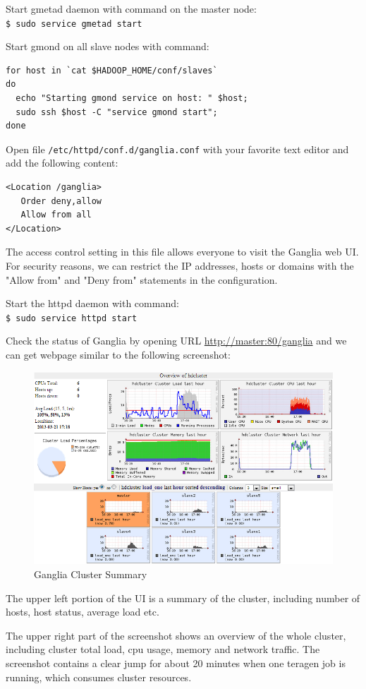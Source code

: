 Start gmetad daemon with command on the master node: \\
\verb|$ sudo service gmetad start|

Start gmond on all slave nodes with command: 
\begin{verbatim}
for host in `cat $HADOOP_HOME/conf/slaves`
do
  echo "Starting gmond service on host: " $host;
  sudo ssh $host -C "service gmond start";
done
\end{verbatim}

Open file \verb|/etc/httpd/conf.d/ganglia.conf| with your favorite text editor and add the following content: 
\begin{verbatim}
<Location /ganglia>
   Order deny,allow
   Allow from all
</Location>
\end{verbatim}

The access control setting in this file allows everyone to visit the Ganglia web UI. For security reasons, we can restrict the IP addresses, hosts or domains with the "Allow from" and "Deny from" statements in the configuration.

Start the httpd daemon with command: \\
\verb|$ sudo service httpd start|

Check the status of Ganglia by opening URL \url{http://master:80/ganglia} and we can get webpage similar to the following screenshot:
\begin{figure}[ht]
  \centering
  \includegraphics[width=.8\textwidth]{figs/5163os_06_06.png}
  \caption{Ganglia Cluster Summary}\label{fig:ganglia.cluster.summary}
\end{figure} 
The upper left portion of the UI is a summary of the cluster, including number of hosts, host status, average load etc.

The upper right part of the screenshot shows an overview of the whole cluster, including cluster total load, cpu usage, memory and network traffic. The screenshot contains a clear jump for about 20 minutes when one teragen job is running, which consumes cluster resources.

